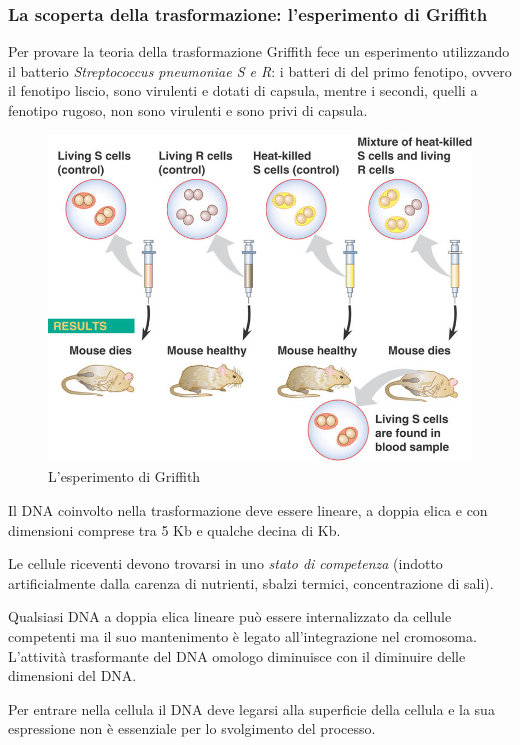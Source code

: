 \documentclass[11pt]{book}
\begin{document}
\subsubsection{La scoperta della trasformazione: l'esperimento di Griffith}
Per provare la teoria della trasformazione Griffith fece un esperimento utilizzando il batterio \emph{Streptococcus pneumoniae S e R}: i batteri di del primo fenotipo, ovvero il fenotipo liscio, sono virulenti e dotati di capsula, mentre i secondi, quelli a fenotipo rugoso, non sono  virulenti e sono privi di capsula.

\begin{figure}[htp]
\centering
\includegraphics[scale=0.6]{img/Griffith Experiment.jpg}
\caption{L'esperimento di Griffith}
\label{}
\end{figure}

Il DNA coinvolto nella trasformazione deve essere lineare, a doppia elica e con dimensioni comprese tra 5 Kb e qualche decina di Kb.

Le cellule riceventi devono trovarsi in uno \emph{stato di competenza} (indotto artificialmente dalla carenza di nutrienti, sbalzi termici, concentrazione di sali).

Qualsiasi DNA a doppia elica lineare può essere internalizzato da cellule competenti ma il suo mantenimento è legato all’integrazione nel cromosoma.
L’attività trasformante del DNA omologo diminuisce con il diminuire delle dimensioni del DNA.

Per entrare nella cellula il DNA deve legarsi alla superficie della cellula e la sua espressione non è essenziale per lo svolgimento del processo.
\end{document}
